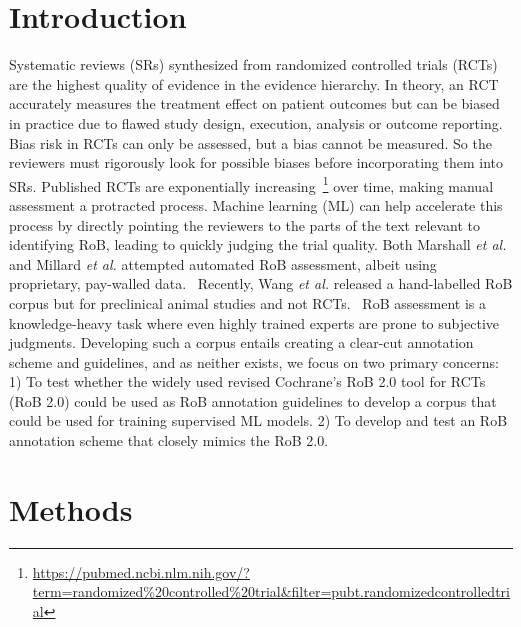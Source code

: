 \documentclass{IOS-Book-Article}
\begin{document}
\section{Introduction}
\label{sec:intro}
%
Systematic reviews (SRs) synthesized from randomized controlled trials (RCTs) are the highest quality of evidence in the evidence hierarchy.
In theory, an RCT accurately measures the treatment effect on patient outcomes but can be biased in practice due to flawed study design, execution, analysis or outcome reporting.~\cite{hariton2018randomised}
Bias risk in RCTs can only be assessed, but a bias cannot be measured.
So the reviewers must rigorously look for possible biases before incorporating them into SRs.
Published RCTs are exponentially increasing~\footnote{\url{https://pubmed.ncbi.nlm.nih.gov/?term=randomized\%20controlled\%20trial&filter=pubt.randomizedcontrolledtrial}} over time, making manual assessment a protracted process.
Machine learning (ML) can help accelerate this process by directly pointing the reviewers to the parts of the text relevant to identifying RoB, leading to quickly judging the trial quality.
Both Marshall \textit{et al.} and Millard \textit{et al.} attempted automated RoB assessment, albeit using proprietary, pay-walled data.~\cite{marshall2015automating,millard2016machine}
Recently, Wang \textit{et al.} released a hand-labelled RoB corpus but for preclinical animal studies and not RCTs.~\cite{wang2022risk}
RoB assessment is a knowledge-heavy task where even highly trained experts are prone to subjective judgments.
Developing such a corpus entails creating a clear-cut annotation scheme and guidelines, and as neither exists, we focus on two primary concerns:
1) To test whether the widely used revised Cochrane's RoB 2.0 tool for RCTs (RoB 2.0) could be used as RoB annotation guidelines to develop a corpus that could be used for training supervised ML models.
2) To develop and test an RoB annotation scheme that closely mimics the RoB 2.0.~\cite{lansbury2020co,sterne2019rob}
%
%
%
\section{Methods}
\label{sec:methods}
%
\end{document}
